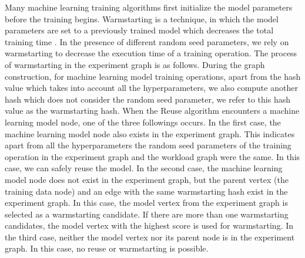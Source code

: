 Many machine learning training algorithms first initialize the model parameters before the training begins. 
Warmstarting is a technique, in which the model parameters are set to a previously trained model which decreases the total training time \cite{baylor2017tfx}.
In the presence of different random seed parameters, we rely on warmstarting to decrease the execution time of a training operation.
The process of warmstarting in the experiment graph is as follows.
During the graph construction, for machine learning model training operations, apart from the hash value which takes into account all the hyperparameters, we also compute another hash which does not consider the random seed parameter, we refer to this hash value as the warmstarting hash.
When the Reuse algorithm encounters a machine learning model node, one of the three followings occurs.
In the first case, the machine learning model node also exists in the experiment graph. 
This indicates apart from all the hyperparameters the random seed parameters of the training operation in the experiment graph and the workload graph were the same.
In this case, we can safely reuse the model.
In the second case, the machine learning model node does not exist in the experiment graph, but the parent vertex (the training data node) and an edge with the same warmstarting hash exist in the experiment graph.
In this case, the model vertex from the experiment graph is selected as a warmstarting candidate.
If there are more than one warmstarting candidates, the model vertex with the highest score is used for warmstarting.
In the third case, neither the model vertex nor its parent node is in the experiment graph.
In this case, no reuse or warmstarting is possible.